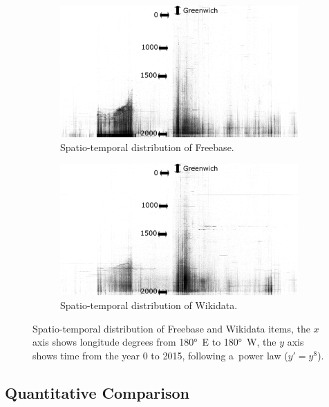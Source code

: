 \documentclass{sig-alternate-2013}
\begin{document}
\begin{figure}[t!]
    \centering
    \begin{subfigure}[b]{1.0\columnwidth}
        \includegraphics[width=\textwidth]{img/freebase-projection-bw.pdf}
        \caption{Spatio-temporal distribution of Freebase.}
        \label{fig:freebase}
    \end{subfigure}
    \begin{subfigure}[b]{1.0\columnwidth}
        \includegraphics[width=\textwidth]{img/wikidata-projection-bw.pdf}
        \caption{Spatio-temporal distribution of Wikidata.}
        \label{fig:wikidata}
    \end{subfigure}
    \caption{Spatio-temporal distribution of Freebase and Wikidata items,
      the $x$ axis shows longitude degrees from 180°~E to 180°~W, the $y$ axis shows time
      from the year 0 to 2015, following a~power law ($y' = y^8$).}
    \label{fig:time-space}
\end{figure}

\subsection{Quantitative Comparison}
\end{document}
